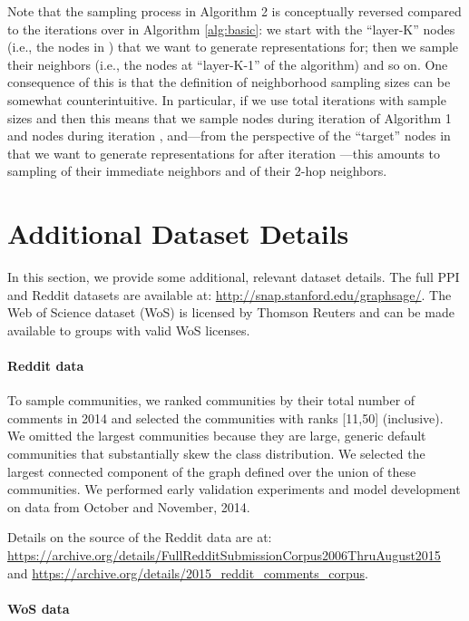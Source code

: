Note that the sampling process in Algorithm 2 is conceptually reversed compared to the iterations over  in Algorithm \ref{alg:basic}: we start with the ``layer-K'' nodes (i.e., the nodes in ) that we want to generate representations for; then we sample their neighbors (i.e., the nodes at ``layer-K-1'' of the algorithm) and so on.
One consequence of this is that the definition of neighborhood sampling sizes can be somewhat counterintuitive.
In particular, if we use  total iterations with sample sizes  and  then this means that we sample  nodes during iteration  of Algorithm 1 and  nodes during iteration , and---from the perspective of the ``target'' nodes in  that we want to generate representations for after iteration ---this amounts to sampling  of their immediate neighbors and  of their 2-hop neighbors. 


\section{Additional Dataset Details}

In this section, we provide some additional, relevant dataset details.
The full PPI and Reddit datasets are available at: \url{http://snap.stanford.edu/graphsage/}.
The Web of Science dataset (WoS) is licensed by Thomson Reuters and can be made available to groups with valid WoS licenses. 

\paragraph{Reddit data}

To sample communities, we ranked communities by their total number of comments in 2014 and selected the communities with ranks [11,50] (inclusive).
We omitted the largest communities because they are large, generic default communities that substantially skew the class distribution.  
We selected the largest connected component of the graph defined over the union of these communities. 
We performed early validation experiments and model development on data from October and November, 2014. 

Details on the source of the Reddit data are at: \url{https://archive.org/details/FullRedditSubmissionCorpus2006ThruAugust2015} and
\url{https://archive.org/details/2015_reddit_comments_corpus}.

\paragraph{WoS data}

